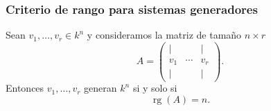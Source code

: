 \begin{frame}
    \frametitle{Criterio de rango para sistemas generadores}

    \begin{theorem}
        Sean \(v_1,\ldots,v_r\in k^n\) y consideramos la matriz de tamaño \(n\times r\)
        \[
            A=
            \begin{pmatrix}
                \vert & & \vert\\
                v_1 & \cdots & v_r\\
                \vert & & \vert
            \end{pmatrix}.
        \]
        Entonces \(v_1,\ldots,v_r\) generan \(k^n\) si y solo si
        \[
            \operatorname{rg}(A)=n.
        \]
    \end{theorem}

\end{frame}


